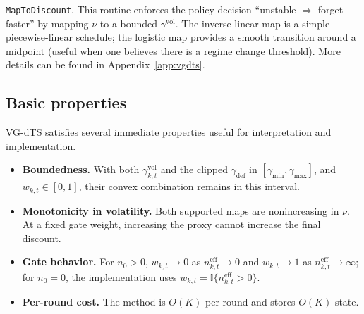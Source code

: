 \documentclass{article}
\begin{document}
\texttt{MapToDiscount}.
This routine enforces the policy decision ``unstable $\Rightarrow$ forget faster'' by mapping $\nu$ to a bounded $\gamma^{\mathrm{vol}}$.
The inverse-linear map is a simple piecewise-linear schedule; the logistic map provides a smooth transition around a midpoint (useful when one believes there is a regime change threshold). More details can be found in Appendix~\ref{app:vgdts}.

\subsection{Basic properties}
VG-dTS satisfies several immediate properties useful for interpretation and implementation.
\begin{itemize}
\item \textbf{Boundedness.} With both $\gamma^{\mathrm{vol}}_{k,t}$ and the clipped $\gamma_{\mathrm{def}}$ in $[\gamma_{\min},\gamma_{\max}]$, and $w_{k,t}\in[0,1]$, their convex combination remains in this interval.
\item \textbf{Monotonicity in volatility.} Both supported maps are nonincreasing in $\nu$. At a fixed gate weight, increasing the proxy cannot increase the final discount.
\item \textbf{Gate behavior.} For $n_0>0$, $w_{k,t}\to 0$ as $n^{\mathrm{eff}}_{k,t}\to 0$ and $w_{k,t}\to 1$ as $n^{\mathrm{eff}}_{k,t}\to\infty$; for $n_0=0$, the implementation uses $w_{k,t}=\mathbb{I}\{n^{\mathrm{eff}}_{k,t}>0\}$.
\item \textbf{Per-round cost.} The method is $O(K)$ per round and stores $O(K)$ state.
\end{itemize}




\end{document}
